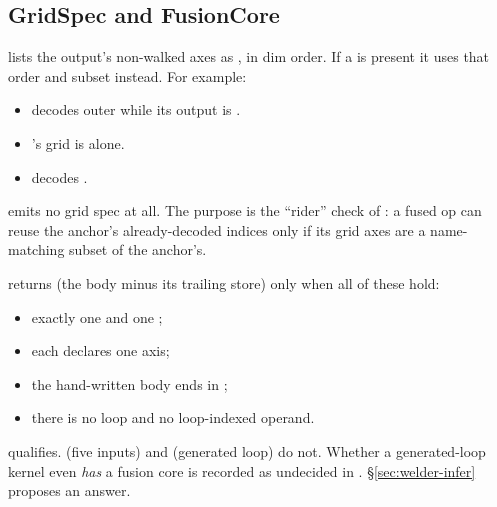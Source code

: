 \subsection{GridSpec and FusionCore}

 lists the output's non-walked axes as , in dim order. If a \code{#[tile_grid(order =
..)]} is present it uses that order and subset instead. For example:
\begin{itemize}
\item {} decodes  outer while its output is
  \code{[N, M]}.
\item {}'s grid is \code{[C]} alone.
\item {} decodes .
\end{itemize}
 emits no grid spec at all. The purpose is the ``rider'' check of
: a fused op can reuse the anchor's already-decoded indices
only if its grid axes are a name-matching subset of the anchor's.

 returns  (the body minus its trailing store) only when all of
these hold:
\begin{itemize}
\item exactly one  and one ;
\item each declares one axis;
\item the hand-written body ends in ;
\item there is no  loop and no loop-indexed operand.
\end{itemize}
 qualifies.  (five
inputs) and  (generated loop) do not. Whether a generated-loop
kernel even \emph{has} a fusion core is recorded as undecided in
. \S\ref{sec:welder-infer} proposes an answer.
